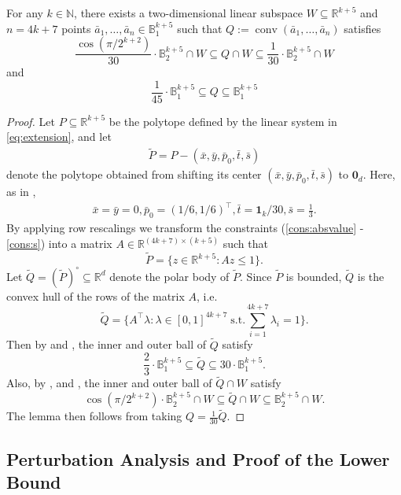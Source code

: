 \documentclass{theoretics}
\newcommand{\R}{\mathbb R}
\newcommand{\N}{\mathbb N}
\newcommand{\conv}{\operatorname{conv}}
\newcommand{\ball}{\mathbb{B}_2}
\renewcommand{\subset}{\subseteq}
\begin{document}
\begin{lemma}\label{lem:lb-prim-to-dual}
For any $k \in \N$, there exists a two-dimensional linear subspace $W \subset \R^{k+5}$ and $n = 4k+7$ points $\bar a_1,\ldots,\bar a_n \in \mathbb{B}_1^{k+5}$ such that $Q := \conv(\bar a_1,\ldots,\bar a_n)$ satisfies
\[
\frac{\cos(\pi/2^{k+2})}{30} \cdot \ball^{k+5} \cap W \subset Q \cap W \subset \frac{1}{30}\cdot \ball^{k+5}\cap W
\]
and
\[
    \frac{1}{45} \cdot \mathbb{B}_1^{k+5} \subset Q \subset \mathbb{B}_1^{k+5}
\]
\end{lemma}
\begin{proof}
Let $P \subset \R^{k+5}$ be the polytope defined by the linear system in \eqref{eq:extension}, and let 
\begin{align*}
    \tilde{P} = P - (\bar x, \bar y, \bar{p}_0, \bar t, \bar{s})
\end{align*}
denote the polytope obtained from shifting its center $(\bar x, \bar y, \bar{p}_0, \bar t, \bar{s})$ to $\mathbf{0}_d$.
Here, as in ,
\begin{align*}
    \bar x = \bar y = 0, \bar{p}_0 = (1/6,1/6)^\top, \bar t  = \mathbf{1}_{k}/30, \bar{s} = \frac{1}{3}.
\end{align*}
By applying row rescalings we transform the constraints
(\ref{cons:absvalue} - \ref{cons:s})
into a matrix $A \in \R^{(4k+7)\times(k+5)}$
such that
\[
\tilde{P} = \{z \in \R^{k+5} : Az \leq 1\}.
\]
Let $\tilde{Q} = (\tilde{P})^\circ \subset \R^d$ denote the polar body of $\tilde{P}$.
Since $\tilde{P}$ is bounded, $\tilde{Q}$ is the convex hull of the rows of the matrix $A$, i.e.
\[
\tilde{Q} = \{A^\top\lambda : \lambda \in [0,1]^{4k+7}\; \mbox{s.t.} \sum_{i=1}^{4k+7} \lambda_i = 1\}.
\]
Then by  and , the inner and outer ball of $\tilde{Q}$ satisfy
\[
    \frac{2}{3}\cdot \mathbb{B}_1^{k+5} \subset \tilde{Q} \subset 30\cdot \mathbb{B}_1^{k+5}.
\]
Also, by ,  and , the inner and outer ball of $\tilde{Q} \cap W$ satisfy
\[
\cos(\pi/2^{k+2}) \cdot \ball^{k+5}\cap W \subset \tilde{Q} \cap W \subset \ball^{k+5} \cap W.
\]
The lemma then follows from taking $Q = \frac{1}{30}\tilde{Q}$.
\end{proof}



\subsection{Perturbation Analysis and Proof of the Lower Bound}\label{sec:lb-perturbation}
\end{document}

